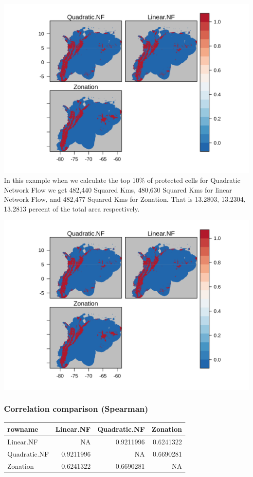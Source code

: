 \documentclass[]{article}
\begin{document}
\includegraphics{NFPaper_files/figure-latex/unnamed-chunk-3-1.png}
In this example when we calculate the top 10\% of protected cells for Quadratic Network Flow we get 482,440 Squared Kms, 480,630 Squared Kms for linear Network Flow, and 482,477 Squared Kms for Zonation. That is 13.2803, 13.2304, 13.2813 percent of the total area respectively.

\includegraphics{NFPaper_files/figure-latex/unnamed-chunk-4-1.png}

\hypertarget{correlation-comparison-spearman}{%
\subsubsection{Correlation comparison (Spearman)}\label{correlation-comparison-spearman}}

\begin{table}[H]
\centering
\begin{tabular}{lrrr}
\toprule
rowname & Linear.NF & Quadratic.NF & Zonation\\
\midrule
Linear.NF & NA & 0.9211996 & 0.6241322\\
Quadratic.NF & 0.9211996 & NA & 0.6690281\\
Zonation & 0.6241322 & 0.6690281 & NA\\
\bottomrule
\end{tabular}
\end{table}
\end{document}
